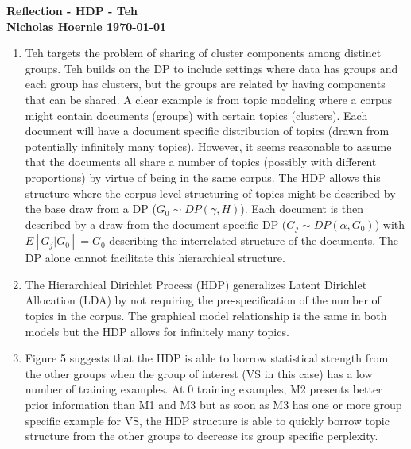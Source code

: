 \documentclass[twoside]{article}
\begin{document}
\textbf{Reflection - HDP - Teh}\\
\textbf{Nicholas Hoernle \hfill \today}

\begin{enumerate}
  \item Teh targets the problem of sharing of cluster components among distinct groups. Teh builds on the DP to include settings where data has groups and each group has clusters, but the groups are related by having components that can be shared. A clear example is from topic modeling where a corpus might contain documents (groups) with certain topics (clusters). Each document will have a document specific distribution of topics (drawn from potentially infinitely many topics). However, it seems reasonable to assume that the documents all share a number of topics (possibly with different proportions) by virtue of being in the same corpus. The HDP allows this structure where the corpus level structuring of topics might be described by the base draw from a DP ($G_0 \sim DP(\gamma, H)$). Each document is then described by a draw from the document specific DP ($G_j \sim DP(\alpha, G_0)$) with $E[G_j | G_0] = G_0$ describing the interrelated structure of the documents. The DP alone cannot facilitate this hierarchical structure.
  \item The Hierarchical Dirichlet Process (HDP) generalizes Latent Dirichlet Allocation (LDA) by not requiring the pre-specification of the number of topics in the corpus. The graphical model relationship is the same in both models but the HDP allows for infinitely many topics.
  \item Figure 5 suggests that the HDP is able to borrow statistical strength from the other groups when the group of interest (VS in this case) has a low number of training examples. At 0 training examples, M2 presents better prior information than M1 and M3 but as soon as M3 has one or more group specific example for VS, the HDP structure is able to quickly borrow topic structure from the other groups to decrease its group specific perplexity.
\end{enumerate}


% 
\end{document}
